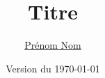 \documentclass[12pt,twoside,a4paper]{memoir}
\title{Titre}
\author[1,2,3]{\href{mailto:penom.nom@mail.com}{Prénom Nom}}
\affil[1]{\small{Tutelle 1}}
\affil[2]{\small{Tutelle 2}}
\affil[3]{\small{Tutelle 3}}
\date{Version du \today}
\renewcommand{\listfigurename}{Liste des figures}
\begin{document}
\frontmatter

\begin{titlingpage}
\maketitle %
\end{titlingpage}






\mainmatter

\tableofcontents













\clearpage 
\renewcommand{\listfigurename}{Liste des figures}
{
    \small
    \listoffigures
}

\clearpage 
{
    \small
    \listoftables
}


\printbibliography 
\end{document}
